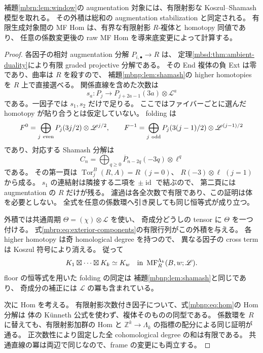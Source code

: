 \begin{lemma}
\label{mbrn:lem:finite-models}
補題\ref{mbrn:lem:window}の augmentation 対象には、有限射影な Koszul--Shamash 模型を取れる。
その外積は総和の augmentation stabilization と同定される。
有限生成対象間の MF Hom は、有界な有限射影 $R$-複体と homotopy 同値であり、
任意の係数変更後の raw MF Hom を導来底変更によって計算する。
\end{lemma}
\begin{proof}
各因子の相対 augmentation 分解 $P_{i,\bullet}\to R$ は、
定理\ref{mbsd:thm:ambient-duality}により有限 graded projective 分解である。
その End 複体の負 Ext は零であり、曲率は $R$ を殺すので、
補題\ref{mbnp:lem:shamash}の higher homotopies を $R$ 上で直接選べる。
関係直線を含めた次数は
\[
 s_a:P_j\longrightarrow P_{j+2a-1}(3a)\otimes\mathscr L^a
\]
である。一因子では $s_1,s_2$ だけで足りる。
ここではファイバーごとに選んだ homotopy が貼り合うとは仮定していない。
folding は
\[
 F^0=\bigoplus_{j\ {\rm even}}P_j(3j/2)\otimes\mathscr L^{j/2},
 \qquad
 F^{-1}=\bigoplus_{j\ {\rm odd}}
             P_j(3(j-1)/2)\otimes\mathscr L^{(j-1)/2}
\]
であり、対応する Shamash 分解は
\[
 C_n=\bigoplus_{q\geq0}
       \overline P_{n-2q}(-3q)\otimes\ell^q
\]
である。
その第一頁は
$\operatorname{Tor}^{B}_j(R,A)=R$ $(j=0)$、
$R(-3)\otimes\ell$ $(j=1)$ から成る。
$s_1$ の連結射は隣接する二項を $\pm\operatorname{id}$ で結ぶので、
第二頁には augmentation の $R$ だけが残る。
濾過は各全次数で有限であり、この証明は体を必要としない。
全式を任意の係数環へ引き戻しても同じ恒等式が成り立つ。

外積では共通周期 $\Theta=(\chi)\otimes\mathscr L$ を使い、
奇成分どうしの tensor に $\Theta$ を一つ付ける。
式\eqref{mbrp:eq:exterior-components}の有限行列がこの外積を与える。
各 higher homotopy は奇 homological degree を持つので、
異なる因子の cross term は Koszul 符号により消える。
従って
\[
 K_1\boxtimes\cdots\boxtimes K_k\simeq K_w
 \quad\text{in }\operatorname{MF}^{\Lambda_k}_R(B,w;\mathscr L).
\]
floor の恒等式を用いた folding の同定は
補題\ref{mbnp:lem:shamash}と同じであり、
奇成分の補正には $\mathscr L$ の冪も含まれている。

次に Hom を考える。
有限射影次数付き因子について、式\eqref{mbnp:eq:hom}の Hom 分解は
体の K\"unneth 公式を使わず、複体そのものの同型である。
係数環を $R$ に替えても、有限射影加群の Hom と
$\mathbb Z^k\to\Lambda_k$ の指標の配分による同じ証明が通る。
正次数性により固定した全 cohomological degree の和は有限である。
共通直線の冪は両辺で同じなので、frame の変更にも両立する。


\end{proof}
